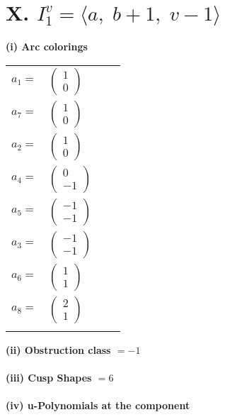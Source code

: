 \documentclass[1p]{elsarticle_modified}
\theoremstyle{definition}
\begin{document}
\centering \section*{X. $I^v_{1}= \langle a,\;b+1,\;v-1 \rangle$}
\flushleft \textbf{(i) Arc colorings}\\
\begin{tabular}{m{7pt} m{180pt} m{7pt} m{180pt} }
\flushright $a_{1}=$&$\begin{pmatrix}1\\0\end{pmatrix}$ \\
\flushright $a_{7}=$&$\begin{pmatrix}1\\0\end{pmatrix}$ \\
\flushright $a_{2}=$&$\begin{pmatrix}1\\0\end{pmatrix}$ \\
\flushright $a_{4}=$&$\begin{pmatrix}0\\-1\end{pmatrix}$ \\
\flushright $a_{5}=$&$\begin{pmatrix}-1\\-1\end{pmatrix}$ \\
\flushright $a_{3}=$&$\begin{pmatrix}-1\\-1\end{pmatrix}$ \\
\flushright $a_{6}=$&$\begin{pmatrix}1\\1\end{pmatrix}$ \\
\flushright $a_{8}=$&$\begin{pmatrix}2\\1\end{pmatrix}$\\&\end{tabular}
\flushleft \textbf{(ii) Obstruction class $= -1$}\\~\\
\flushleft \textbf{(iii) Cusp Shapes $= 6$}\\~\\
\newpage\renewcommand{\arraystretch}{1}
\flushleft \textbf{(iv) u-Polynomials at the component}\newline \\
\end{document}
